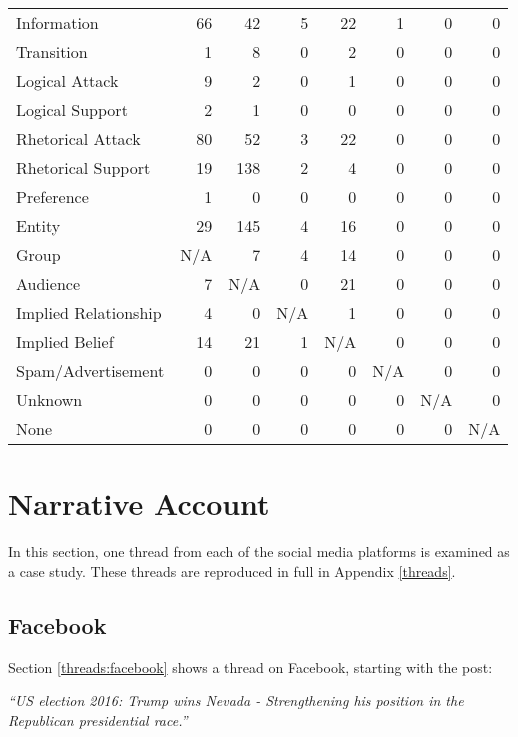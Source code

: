 \begin{sidewaystable}
\begin{tabular} { l  | r | r | r | r | r | r | r  }
\hline
Information &  66  &  42  &  5  &  22  &  1  &  0  &  0 \\
Transition &  1  &  8  &  0  &  2  &  0  &  0  &  0 \\
Logical Attack &  9  &  2  &  0  &  1  &  0  &  0  &  0 \\
Logical Support &  2  &  1  &  0  &  0  &  0  &  0  &  0 \\
Rhetorical Attack  &  80  &  52  &  3  &  22  &  0  &  0  &  0 \\
Rhetorical Support &  19  &  138  &  2  &  4  &  0  &  0  &  0 \\
Preference   &  1  &  0  &  0  &  0  &  0  &  0  &  0 \\
Entity &  29  &  145  &  4  &  16  &  0  &  0  &  0 \\
Group &  N/A  &  7  &  4  &  14  &  0  &  0  &  0 \\
Audience &  7  &  N/A  &  0  &  21  &  0  &  0  &  0 \\
Implied Relationship &  4  &  0  &  N/A  &  1  &  0  &  0  &  0 \\
Implied Belief &  14  &  21  &  1  &  N/A  &  0  &  0  &  0 \\
Spam/Advertisement &  0  &  0  &  0  &  0  &  N/A  &  0  &  0 \\
Unknown &  0  &  0  &  0  &  0  &  0  &  N/A  &  0 \\
None &  0  &  0  &  0  &  0  &  0  &  0  &  N/A \\
\end{tabular}
\end{sidewaystable}



\section{Narrative Account}

\newcommand{\scaleCaseThread}{0.7}
In this section, one thread from each of the social media platforms is examined as a case study. These threads are reproduced in full in Appendix \ref{threads}.

\subsection{Facebook}
Section \ref{threads:facebook} shows a thread on Facebook, starting with the post:

\textit{``US election 2016: Trump wins Nevada - Strengthening his position in the Republican presidential race.''}

